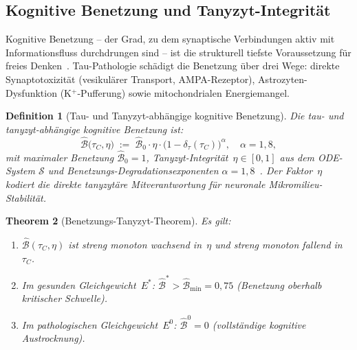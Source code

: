 ﻿\documentclass[12pt,a4paper]{article}
\newtheorem{theorem}{Theorem}[section]
\newtheorem{definition}[theorem]{Definition}
\theoremstyle{definition}
\begin{document}
	\subsection{Kognitive Benetzung und Tanyzyt-Integrität}

	Kognitive Benetzung -- der Grad, zu dem synaptische Verbindungen aktiv mit
	Informationsfluss durchdrungen sind -- ist die strukturell tiefste Voraussetzung für
	freies Denken~\cite{Epp2026brn}. Tau-Pathologie schädigt die Benetzung über drei Wege:
	direkte Synaptotoxizität (vesikulärer Transport, AMPA-Rezeptor), Astrozyten-Dysfunktion
	(K$^+$-Pufferung) sowie mitochondrialen Energiemangel.

	\begin{definition}[Tau- und Tanyzyt-abhängige kognitive Benetzung]
		\label{def:nass_tany}
		Die \emph{tau- und tanyzyt-abhängige kognitive Benetzung} ist:
		\[
			\hat{\mathcal{B}}\bigl(\tau_C, \eta\bigr)
			\;:=\;
			\hat{\mathcal{B}}_0 \cdot \eta \cdot
			\bigl(1 - \delta_\tau(\tau_C)\bigr)^{\!\alpha},
			\quad \alpha = 1{,}8,
		\]
		mit maximaler Benetzung $\hat{\mathcal{B}}_0 = 1$, Tanyzyt-Integrität~$\eta \in [0,1]$
		aus dem ODE-System $\mathcal{S}$ und Benetzungs-Degradationsexponenten
		$\alpha = 1{,}8$~\cite{Epp2026brn}. Der Faktor~$\eta$ kodiert die direkte
		tanyzytäre Mitverantwortung für neuronale Mikromilieu-Stabilität.
	\end{definition}

	\begin{theorem}[Benetzungs-Tanyzyt-Theorem]
		\label{thm:benet_tany}
		Es gilt:
		\begin{enumerate}[label=(\roman*)]
			\item $\hat{\mathcal{B}}(\tau_C, \eta)$ ist streng monoton wachsend in~$\eta$
			      und streng monoton fallend in~$\tau_C$.
			\item Im gesunden Gleichgewicht~$E^*$: $\hat{\mathcal{B}}^* > \hat{\mathcal{B}}_{\min} = 0{,}75$
			      (Benetzung oberhalb kritischer Schwelle).
			\item Im pathologischen Gleichgewicht~$E^0$: $\hat{\mathcal{B}}^0 = 0$
			      (vollständige kognitive Austrocknung).
		\end{enumerate}
	\end{theorem}
\end{document}

